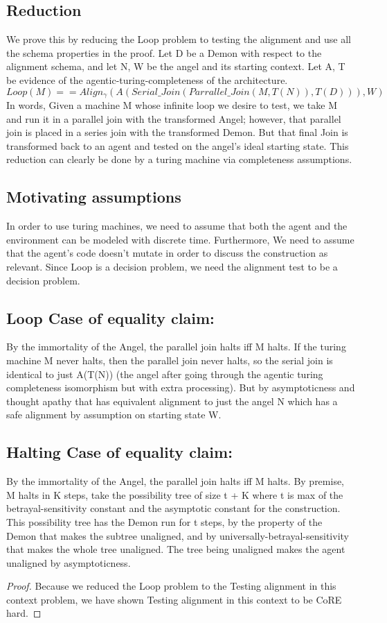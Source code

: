\documentclass[12pt]{article}
\begin{document}
\subsection{Reduction}
 We prove this by reducing the Loop problem to testing the alignment and use all the schema properties in the proof. Let D be a Demon with respect to the alignment schema, and let N, W be the angel and its starting context. Let A, T be evidence of the agentic-turing-completeness of the architecture.
 $$Loop(M) == Align_\gamma ( A(Serial\_Join(Parrallel\_Join(M,T(N) ),T(D))) , W)$$
 In words, Given a machine M whose infinite loop we desire to test, we take M and run it in a parallel join with the transformed Angel; however, that parallel join is placed in a series join with the transformed Demon. But that final Join is transformed back to an agent and tested on the angel's ideal starting state. This reduction can clearly be done by a turing machine via completeness assumptions.
\subsection{Motivating assumptions}
In order to use turing machines, we need to assume that both the agent and the environment can be modeled with discrete time. Furthermore, We need to assume that the agent's code doesn't mutate in order to discuss the construction as relevant. Since Loop is a decision problem, we need the alignment test to be a decision problem. 
\subsection{Loop Case of equality claim:}
 By the immortality of the Angel, the parallel join halts iff M halts.
If the turing machine M never halts, then the parallel join never halts, so the serial join is identical to just A(T(N)) (the angel after going through the agentic turing completeness isomorphism but with extra processing). But by asymptoticness and thought apathy that has equivalent alignment to just the angel N which has a safe alignment by assumption on starting state W.

\subsection{Halting Case of equality claim:}
 By the immortality of the Angel, the parallel join halts iff M halts. By premise, M halts in K steps, take the possibility tree of size t + K where t is max of the betrayal-sensitivity constant and the asymptotic constant for the construction. This possibility tree has the Demon run for t steps, by the property of the Demon that makes the subtree unaligned, and by universally-betrayal-sensitivity that makes the whole tree unaligned. The tree being unaligned makes the agent unaligned by asymptoticness.
\begin{proof} Because we reduced the Loop problem to the Testing alignment in this context problem, we have shown Testing alignment in this context to be CoRE hard. 
\end{proof}
\end{document}
